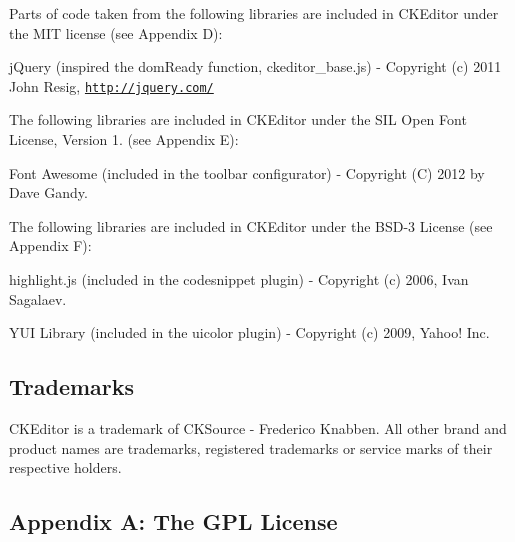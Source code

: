 Parts of code taken from the following libraries are included in C\+K\+Editor under the M\+IT license (see Appendix D)\+:


\begin{DoxyItemize}
\item j\+Query (inspired the dom\+Ready function, ckeditor\+\_\+base.\+js) -\/ Copyright (c) 2011 John Resig, \href{http://jquery.com/}{\tt http\+://jquery.\+com/}
\end{DoxyItemize}

The following libraries are included in C\+K\+Editor under the S\+IL Open Font License, Version 1. (see Appendix E)\+:


\begin{DoxyItemize}
\item Font Awesome (included in the toolbar configurator) -\/ Copyright (C) 2012 by Dave Gandy.
\end{DoxyItemize}

The following libraries are included in C\+K\+Editor under the B\+S\+D-\/3 License (see Appendix F)\+:


\begin{DoxyItemize}
\item highlight.\+js (included in the {\ttfamily codesnippet} plugin) -\/ Copyright (c) 2006, Ivan Sagalaev.
\item Y\+UI Library (included in the {\ttfamily uicolor} plugin) -\/ Copyright (c) 2009, Yahoo! Inc.
\end{DoxyItemize}

\subsection*{Trademarks }

C\+K\+Editor is a trademark of C\+K\+Source -\/ Frederico Knabben. All other brand and product names are trademarks, registered trademarks or service marks of their respective holders. 



\subsection*{Appendix A\+: The G\+PL License }


